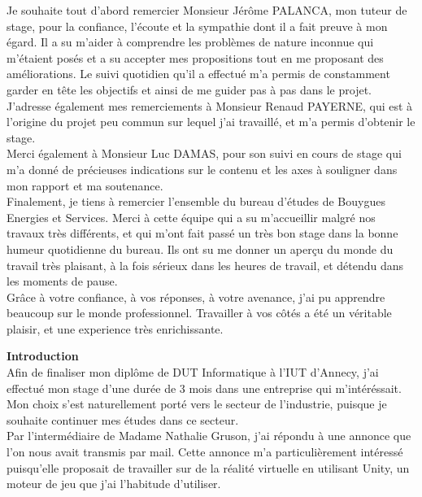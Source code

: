 \documentclass[a4paper]{article}
\begin{document}
    \normalsize
    Je souhaite tout d'abord remercier Monsieur Jérôme PALANCA, mon tuteur de stage, pour la confiance, l'écoute et la sympathie dont il a fait preuve à mon égard. Il a su m'aider à comprendre les problèmes de nature inconnue qui m'étaient posés et a su accepter mes propositions tout en me proposant des améliorations. Le suivi quotidien qu'il a effectué m'a permis de constamment garder en tête les objectifs et ainsi de me guider pas à pas dans le projet. \vspace{10pt} \\
    J'adresse également mes remerciements à Monsieur Renaud PAYERNE, qui est à l'origine du projet peu commun sur lequel j'ai travaillé, et m'a permis d'obtenir le stage. \vspace{10pt} \\
	Merci également à Monsieur Luc DAMAS, pour son suivi en cours de stage qui m'a donné de précieuses indications sur le contenu et les axes à souligner dans mon rapport et ma soutenance. \vspace{10pt} \\
    Finalement, je tiens à remercier l'ensemble du bureau d'études de Bouygues Energies et Services. Merci à cette équipe qui a su m'accueillir malgré nos travaux très différents, et qui m'ont fait passé un très bon stage dans la bonne humeur quotidienne du bureau. Ils ont su me donner un aperçu du monde du travail très plaisant, à la fois sérieux dans les heures de travail, et détendu dans les moments de pause. \vspace{10pt} \\
    Grâce à votre confiance, à vos réponses, à votre avenance, j'ai pu apprendre beaucoup sur le monde professionnel. Travailler à vos côtés a été un véritable plaisir, et une experience très enrichissante. \\
    
    \newpage
    \tableofcontents
    
    \newpage 
    \huge \textbf{Introduction} \vspace{20pt} \\
    \normalsize
    Afin de finaliser mon diplôme de DUT Informatique à l'IUT d'Annecy, j'ai effectué mon stage d'une durée de 3 mois dans une entreprise qui m'intéréssait. Mon choix s'est naturellement porté vers le secteur de l'industrie, puisque je souhaite continuer mes études dans ce secteur. \\

    Par l'intermédiaire de Madame Nathalie Gruson, j'ai répondu à une annonce que l'on nous avait transmis par mail. Cette annonce m'a particulièrement intéressé puisqu'elle proposait de travailler sur de la réalité virtuelle en utilisant Unity, un moteur de jeu que j'ai l'habitude d'utiliser. \\
\end{document}
